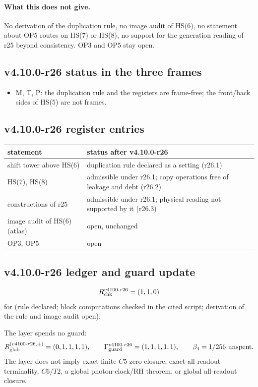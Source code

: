 \paragraph{What this does not give.}
No derivation of the duplication rule, no image audit of HS(6), no statement about OP5 routes on HS(7) or HS(8), no support for the
generation reading of r25 beyond consistency.  OP3 and OP5 stay open.

\subsection*{v4.10.0-r26 status in the three frames}
\label{subsec:v4100-r26-frames}

\begin{itemize}[leftmargin=2em]
\item M, T, P: the duplication rule and the registers are frame-free; the front/back sides of HS(5) are not frames.
\end{itemize}

\subsection*{v4.10.0-r26 register entries}
\label{subsec:v4100-r26-register}

\begin{center}
\small
\begin{tabular}{@{}>{\raggedright\arraybackslash}p{}>{\raggedright\arraybackslash}p{}@{}}
\toprule
statement & status after v4.10.0-r26\\
\midrule
shift tower above HS(6) & duplication rule declared as a setting (r26.1)\\
HS(7), HS(8) & admissible under r26.1; copy operations free of leakage and debt (r26.2)\\
constructions of r25 & admissible under r26.1; physical reading not supported by it (r26.3)\\
image audit of HS(6) (atlas) & open, unchanged\\
OP3, OP5 & open\\
\bottomrule
\end{tabular}
\end{center}

\subsection*{v4.10.0-r26 ledger and guard update}
\label{subsec:v4100-r26-ledger-guard}

\[
R_{\rm chk}^{v4100\text{-}r26}=(1,1,0)
\]
for (rule declared; block computations checked in the cited script; derivation of the rule and image audit open).

The layer spends no guard:
\[
R_{\rm glob}^{(v4100\text{-}r26,+)}=(0,1,1,1,1),
\qquad
\Gamma_{\rm guard}^{v4100\text{-}r26}=(1,1,1,1,1),
\qquad
\beta_4=1/256\ \text{unspent}.
\]
The layer does not imply exact finite \(C5\) zero closure, exact all-readout terminality, \(C6/T2\), a global photon-clock/RH theorem,
or global all-readout closure.
